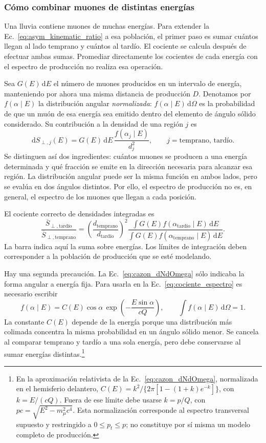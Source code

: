 \subsubsection{Cómo combinar muones de distintas energías}
\label{subsubsec:promedio_energetico}

Una lluvia contiene muones de muchas energías. Para extender la Ec.~\ref{eq:asym_kinematic_ratio} a esa población, el primer paso es sumar cuántos llegan al lado temprano y cuántos al tardío. El cociente se calcula después de efectuar ambas sumas. Promediar directamente los cocientes de cada energía con el espectro de producción no realiza esa operación.

Sea $G(E)\,\mathrm dE$ el número de muones producidos en un intervalo de energía, manteniendo por ahora una misma distancia de producción $D$. Denotamos por $f(\alpha\mid E)$ la distribución angular \emph{normalizada}: $f(\alpha\mid E)\,\mathrm d\Omega$ es la probabilidad de que un muón de esa energía sea emitido dentro del elemento de ángulo sólido considerado. Su contribución a la densidad de una región $j$ es
\[
\mathrm dS_{\perp,j}(E)=G(E)\,\mathrm dE\,
\frac{f(\alpha_j\mid E)}{d_j^2},
\qquad j=\text{temprano, tardío}.
\]
Se distinguen así dos ingredientes: cuántos muones se producen a una energía determinada y qué fracción se emite en la dirección necesaria para alcanzar esa región. La distribución angular puede ser la misma función en ambos lados, pero se evalúa en dos ángulos distintos. Por ello, el espectro de producción no es, en general, el espectro de los muones que llegan a cada posición.

El cociente correcto de densidades integradas es
\begin{equation}
\frac{\overline S_{\perp,\text{tardío}}}
     {\overline S_{\perp,\mathrm{temprano}}}
=\left(\frac{d_{\mathrm{temprano}}}{d_{\text{tardío}}}\right)^2
\frac{\displaystyle\int G(E)f(\alpha_{\text{tardío}}\mid E)\,\mathrm dE}
     {\displaystyle\int G(E)f(\alpha_{\mathrm{temprano}}\mid E)\,\mathrm dE}.
\label{eq:cociente_espectro}
\end{equation}
La barra indica aquí la suma sobre energías. Los límites de integración deben corresponder a la población de producción que se esté modelando.

Hay una segunda precaución. La Ec.~\ref{eq:cazon_dNdOmega} sólo indicaba la forma angular a energía fija. Para usarla en la Ec.~\ref{eq:cociente_espectro} es necesario escribir
\[
f(\alpha\mid E)=C(E)\cos\alpha\,
\exp\!\left(-\frac{E\sin\alpha}{cQ}\right),
\qquad \int f(\alpha\mid E)\,\mathrm d\Omega=1.
\]
La constante $C(E)$ depende de la energía porque una distribución más colimada concentra la misma probabilidad en un ángulo sólido menor. Se cancela al comparar temprano y tardío a una sola energía, pero debe conservarse al sumar energías distintas.\footnote{En la aproximación relativista de la Ec.~\ref{eq:cazon_dNdOmega}, normalizada en el hemisferio delantero, $C(E)=k^2/\{2\pi[1-(1+k)e^{-k}]\}$, con $k=E/(cQ)$. Fuera de ese límite debe usarse $k=p/Q$, con $pc=\sqrt{E^2-m_\mu^2c^4}$. Esta normalización corresponde al espectro transversal supuesto y restringido a $0\leq p_t\leq p$; no constituye por sí misma un modelo completo de producción.}

